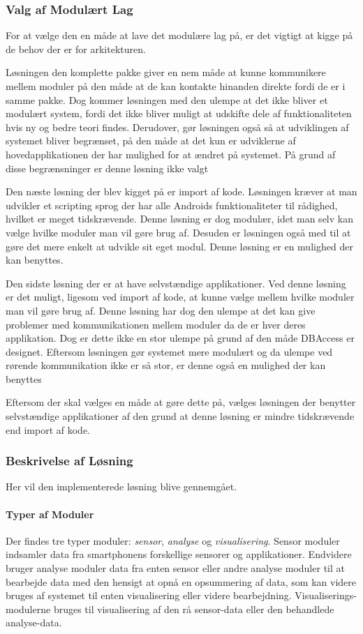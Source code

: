\subsubsection{Valg af Modulært Lag}
For at vælge den en måde at lave det modulære lag på, er det vigtigt at kigge på de behov der er for arkitekturen.

Løsningen den komplette pakke giver en nem måde at kunne kommunikere mellem moduler på den måde at de kan kontakte hinanden direkte fordi de er i samme pakke.
Dog kommer løsningen med den ulempe at det ikke bliver et modulært system, fordi det ikke bliver muligt at udskifte dele af funktionaliteten hvis ny og bedre teori findes.
Derudover, gør løsningen også så at udviklingen af systemet bliver begrænset, på den måde at det kun er udviklerne af hovedapplikationen der har mulighed for at ændret på systemet.
På grund af disse begrænsninger er denne løsning ikke valgt

Den næste løsning der blev kigget på er import af kode.
Løsningen kræver at man udvikler et scripting sprog der har alle Androids funktionaliteter til rådighed, hvilket er meget tidskrævende.
Denne løsning er dog modulær, idet man selv kan vælge hvilke moduler man vil gøre brug af.
Desuden er løsningen også med til at gøre det mere enkelt at udvikle sit eget modul.
Denne løsning er en mulighed der kan benyttes.

Den sidste løsning der er at have selvstændige applikationer.
Ved denne løsning er det muligt, ligesom ved import af kode, at kunne vælge mellem hvilke moduler man vil gøre brug af.
Denne løsning har dog den ulempe at det kan give problemer med kommunikationen mellem moduler da de er hver deres applikation.
Dog er dette ikke en stor ulempe på grund af den måde DBAccess er designet.
Eftersom løsningen gør systemet mere modulært og da ulempe ved rørende kommunikation ikke er så stor, er denne også en mulighed der kan benyttes

Eftersom der skal vælges en måde at gøre dette på, vælges løsningen der benytter selvstændige applikationer af den grund at denne løsning er mindre tidskrævende end import af kode.



\subsubsection{Beskrivelse af Løsning}\label{modul_definition}
Her vil den implementerede løsning blive gennemgået.

\paragraph{Typer af Moduler}
Der findes tre typer moduler: \textit{sensor}, \textit{analyse} og \textit{visualisering}.
Sensor moduler indsamler data fra smartphonens forskellige sensorer og applikationer.
Endvidere bruger analyse moduler data fra enten sensor eller andre analyse moduler til at bearbejde data med den hensigt at opnå en opsummering af data, som kan videre bruges af systemet til enten visualisering eller videre bearbejdning.
Visualiserings-modulerne bruges til visualisering af den rå sensor-data eller den behandlede analyse-data.

